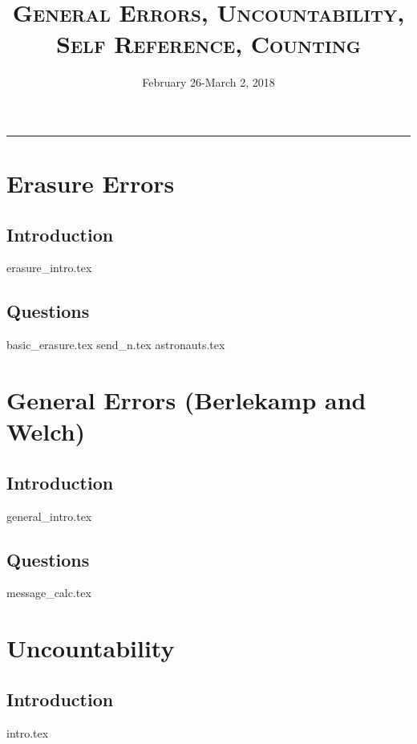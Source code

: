 \documentclass{exam}
\title{\textsc{General Errors, Uncountability, Self Reference, Counting}}
\date{February 26-March 2, 2018}
\begin{document}
\maketitle
\rule{\textwidth}{0.15em}
\fontsize{12}{15}\selectfont


\section{Erasure Errors}
\subsection{Introduction}
{erasure_intro.tex}
\subsection{Questions}
\begin{questions}
{basic_erasure.tex}
{send_n.tex}
{astronauts.tex}
\end{questions}

\section{General Errors (Berlekamp and Welch)}
\subsection{Introduction}
{general_intro.tex}
\subsection{Questions}
\begin{questions}
{message_calc.tex}
\end{questions}

\section{Uncountability}
\subsection{Introduction}
\begin{questions}
{intro.tex}
\end{questions}
\end{document}
